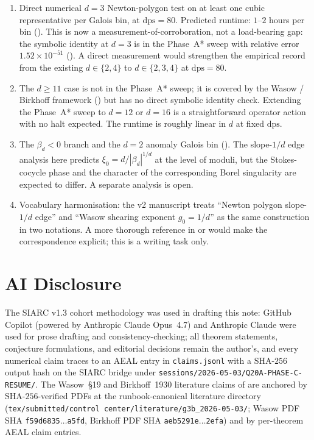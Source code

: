 \documentclass[11pt,reqno]{amsart}
\theoremstyle{plain}
\theoremstyle{definition}
\theoremstyle{remark}
\newcommand{\dps}{\mathrm{dps}}
\begin{document}
\begin{enumerate}[label=(\alph*),leftmargin=2.2em]

\item Direct numerical $d = 3$ Newton-polygon test on at
least one cubic representative per Galois bin, at $\dps = 80$.
Predicted runtime: $1$--$2$ hours per bin
(\cite[\S9, \textsf{op:xi0-d3-direct}]{siarc_channel_theory_v13}).
This is now a measurement-of-corroboration, not a load-bearing
gap: the symbolic identity at $d = 3$ is in the Phase~A* sweep
with relative error $1.52\times 10^{-51}$
(). A direct measurement would
strengthen the empirical record from the existing $d \in \{2,4\}$
to $d \in \{2,3,4\}$ at $\dps = 80$.

\item The $d \ge 11$ case is not in the Phase~A* sweep; it is
covered by the Wasow / Birkhoff framework
() but has no direct symbolic identity check.
Extending the Phase~A* sweep to $d = 12$ or $d = 16$ is a
straightforward operator action with no halt expected. The
runtime is roughly linear in $d$ at fixed $\dps$.

\item The $\beta_d < 0$ branch and the $d = 2$ anomaly
Galois bin (\cite[Remark~5.E]{siarc_pcf1_v13}). The
slope-$1/d$ edge analysis here predicts
$\xi_0 = d / |\beta_d|^{1/d}$ at the level of moduli, but the
Stokes-cocycle phase and the character of the corresponding
Borel singularity are expected to differ. A separate analysis
is open.

\item Vocabulary harmonisation: the v2 manuscript treats
``Newton polygon slope-$1/d$ edge'' and ``Wasow shearing
exponent $g_0 = 1/d$'' as the same construction in two
notations. A more thorough reference in
\cite[ch.~2]{lodayrichaud2016divergent} or
\cite[ch.~7]{costin2008asymptotics} would make the
correspondence explicit; this is a writing task only.

\end{enumerate}

\section*{AI Disclosure}

The SIARC v1.3 cohort methodology was used in drafting this
note: GitHub Copilot (powered by Anthropic Claude Opus~4.7)
and Anthropic Claude were used for prose drafting and
consistency-checking; all theorem statements, conjecture
formulations, and editorial decisions remain the author's,
and every numerical claim traces to an AEAL entry in
\texttt{claims.jsonl} with a SHA-$256$ output hash on the
SIARC bridge under \texttt{sessions/2026-05-03/Q20A-PHASE-C-RESUME/}.
The Wasow~\S19 and Birkhoff~1930 literature claims of
 are anchored by SHA-$256$-verified
PDFs at the runbook-canonical literature directory
(\texttt{tex/submitted/control center/literature/g3b\_2026-05-03/};
Wasow PDF SHA \texttt{f59d6835$\dots$a5fd}, Birkhoff PDF SHA
\texttt{aeb5291e$\dots$2efa}) and by per-theorem AEAL claim
entries.



\end{document}
